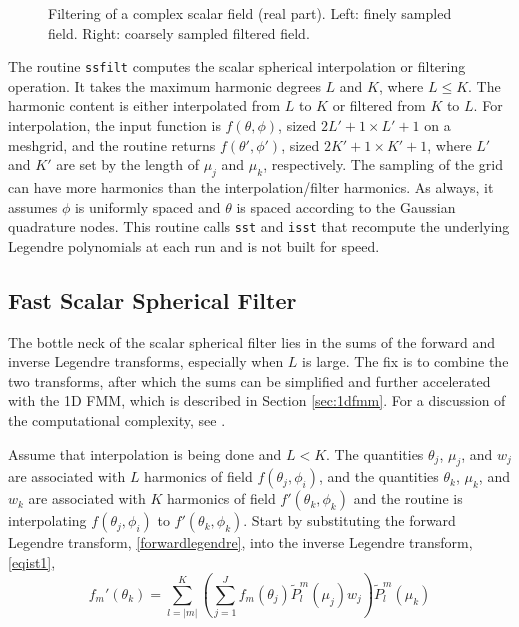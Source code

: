  \begin{figure}[H] 
 \centering
{} 
\caption{Filtering of a complex scalar field (real part). Left: finely sampled field. Right: coarsely sampled filtered field. }
\end{figure}


The routine \texttt{ssfilt} computes the scalar spherical interpolation or filtering operation.  It takes the maximum harmonic degrees $L$ and $K$, where $L \le K$.  The harmonic content is either interpolated from $L$ to $K$ or filtered from $K$ to $L$.  For interpolation, the input function is $f(\theta,\phi)$, sized $2L'+1 \times L' + 1$ on a meshgrid, and the routine returns $f(\theta',\phi')$, sized $2K'+1 \times K'+1$, where $L'$ and $K'$ are set by the length of $\mu_j$ and $\mu_k$, respectively.  The sampling of the grid can have more harmonics than the interpolation/filter harmonics. As always, it assumes $\phi$ is uniformly spaced and $\theta$ is spaced according to the Gaussian quadrature nodes.  This routine calls \texttt{sst} and \texttt{isst} that recompute the underlying Legendre polynomials at each run and is not built for speed.  

{\footnotesize
{}
}

\clearpage

\subsection{Fast Scalar Spherical Filter}
\label{sec:fastscasphfilt}
The bottle neck of the scalar spherical filter lies in the sums of the forward and inverse Legendre transforms, especially when $L$ is large.  The fix is to combine the two transforms, after which the sums can be simplified and further accelerated with the 1D FMM, which is described in Section \ref{sec:1dfmm}. For a discussion of the computational complexity, see \cite{yucel2008helmholtz}.

Assume that interpolation is being done and $L < K$.  The quantities $\theta_j$, $\mu_j$, and $w_j$ are associated with $L$ harmonics of field $f(\theta_j,\phi_i)$, and the quantities $\theta_k$, $\mu_k$, and $w_k$ are associated with $K$ harmonics of field $f'(\theta_k,\phi_k)$ and the routine is interpolating $f(\theta_j,\phi_i)$ to $f'(\theta_k,\phi_k)$. Start by substituting the forward Legendre transform, \eqref{forwardlegendre}, into the inverse Legendre transform, \eqref{eqist1}, 
\begin{equation}
f_m'(\theta_k) = \sum_{l = \vert m \vert}^{K} \left(\sum_{j=1}^J f_m(\theta_j)\widetilde{P}_l^m(\mu_j)w_j\right) \widetilde{P}_l^m(\mu_k)
\end{equation}

